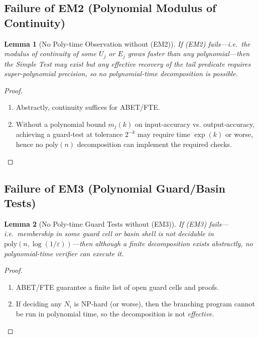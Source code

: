 \documentclass[12pt]{article}
\theoremstyle{definition}
\theoremstyle{plain}
\newtheorem{lemma}{Lemma}[section]
\begin{document}
\subsection{Failure of EM2 (Polynomial Modulus of Continuity)}

\begin{lemma}[No Poly-time Observation without (EM2)]\label{lem:no-EM2}
If (EM2) fails—i.e.\ the modulus of continuity of some $U_j$ or $E_j$ grows
faster than any polynomial—then the Simple Test may exist but any effective
recovery of the tail predicate requires super-polynomial precision, so no
polynomial-time decomposition is possible.
\end{lemma}
\begin{proof}
\begin{enumerate}[label=(\arabic*)]
  \item  Abstractly, continuity suffices for ABET/FTE.
  \item  Without a polynomial bound $m_j(k)$ on input‐accuracy vs. output‐accuracy,
    achieving a guard‐test at tolerance $2^{-k}$ may require time
    $\exp(k)$ or worse, hence no $\mathrm{poly}(n)$ decomposition can
    implement the required checks.
\end{enumerate}
\end{proof}

\subsection{Failure of EM3 (Polynomial Guard/Basin Tests)}

\begin{lemma}[No Poly-time Guard Tests without (EM3)]\label{lem:no-EM3}
If (EM3) fails—i.e.\ membership in some guard cell or basin shell is not
decidable in $\mathrm{poly}(n,\log(1/\varepsilon))$—then although a
finite decomposition exists abstractly, no polynomial-time verifier can
execute it.
\end{lemma}
\begin{proof}
\begin{enumerate}[label=(\arabic*)]
  \item  ABET/FTE guarantee a finite list of open guard cells and proofs.
  \item  If deciding any $N_i$ is $\mathrm{NP}$‐hard (or worse), then the
    branching program cannot be run in polynomial time, so the decomposition
    is not \emph{effective}.
\end{enumerate}
\end{proof}
\end{document}
